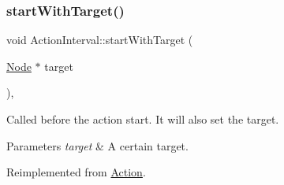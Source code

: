 \subsubsection{\texorpdfstring{start\+With\+Target()}{startWithTarget()}\hspace{0.1cm}{\footnotesize\ttfamily [1/2]}}
{\footnotesize\ttfamily void Action\+Interval\+::start\+With\+Target (\begin{DoxyParamCaption}\item[{\hyperlink{classNode}{Node} $\ast$}]{target }\end{DoxyParamCaption})\hspace{0.3cm}{\ttfamily [override]}, {\ttfamily [virtual]}}

Called before the action start. It will also set the target.


\begin{DoxyParams}{Parameters}
{\em target} & A certain target. \\
\hline
\end{DoxyParams}


Reimplemented from \hyperlink{classAction_a5457090e4a035c6283777c893a9a681b}{Action}.



